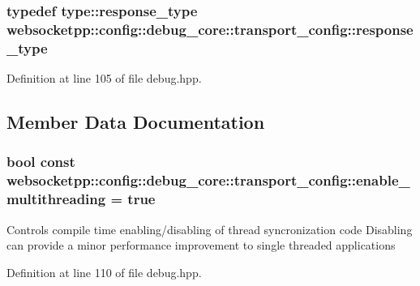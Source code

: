 \subsubsection[{response\+\_\+type}]{\setlength{\rightskip}{0pt plus 5cm}typedef {\bf type\+::response\+\_\+type} {\bf websocketpp\+::config\+::debug\+\_\+core\+::transport\+\_\+config\+::response\+\_\+type}}\label{structwebsocketpp_1_1config_1_1debug__core_1_1transport__config_af3f1a34b5663166430b52e4dd1f1398a}


Definition at line 105 of file debug.\+hpp.



\subsection{Member Data Documentation}
\hypertarget{structwebsocketpp_1_1config_1_1debug__core_1_1transport__config_a082f02f956f0e82ff8646967a7c79e4a}{}
\subsubsection[{enable\+\_\+multithreading}]{\setlength{\rightskip}{0pt plus 5cm}bool const websocketpp\+::config\+::debug\+\_\+core\+::transport\+\_\+config\+::enable\+\_\+multithreading = true\hspace{0.3cm}{\ttfamily [static]}}\label{structwebsocketpp_1_1config_1_1debug__core_1_1transport__config_a082f02f956f0e82ff8646967a7c79e4a}
Controls compile time enabling/disabling of thread syncronization code Disabling can provide a minor performance improvement to single threaded applications 

Definition at line 110 of file debug.\+hpp.

\hypertarget{structwebsocketpp_1_1config_1_1debug__core_1_1transport__config_a467d99957d7b4d5c098f3b916bd97b25}{}
